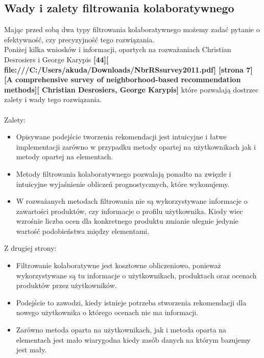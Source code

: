 \documentclass[12pt,a4paper]{report}
\begin{document}
\subsection{Wady i zalety filtrowania kolaboratywnego}
Mając przed sobą dwa typy filtrowania kolaboratywnego możemy zadać pytanie o efektywność, czy precyzyjność tego rozwiązania.
\\Poniżej kilka wniosków i informacji, opartych na rozważaniach Christian Desrosiers i George Karypis \textbf{[44][ file:///C:/Users/akuda/Downloads/NbrRSsurvey2011.pdf] [strona 7] [A comprehensive survey of neighborhood-based recommendation methods][ Christian Desrosiers, George Karypis]} które pozwalają dostrzec zalety i wady tego rozwiązania.
\\ 
\\Zalety:
\begin{itemize}
\item Opisywane podejście tworzenia rekomendacji jest intuicyjne i łatwe implementacji zarówno w przypadku metody opartej na użytkownikach jak i metody opartej na elementach. 
\item Metody filtrowania kolaboratywnego pozwalają ponadto na zwięzłe i intuicyjne wyjaśnienie obliczeń prognostycznych, które wykonujemy.
\item W rozważanych metodach filtrowania nie są wykorzystywane informacje o zawartości produktów, czy informacje o profilu użytkownika. Kiedy wiec wzrośnie liczba ocen dla konkretnego produktu zmianie ulegnie jedynie wartość podobieństwa między elementami.
\end{itemize}
Z drugiej strony:
\begin{itemize}
\item Filtrowanie kolaboratywne jest kosztowne obliczeniowo, ponieważ wykorzystywane są tu informacje o użytkownikach, produktach oraz ocenach produktów przez użytkowników. 
\item Podejście to zawodzi, kiedy istnieje potrzeba stworzenia rekomendacji dla nowego użytkownika o którego ocenach nie ma informacji.
\item Zarówno metoda oparta na użytkownikach, jak i metoda oparta na elementach jest mało wiarygodna kiedy zasób danych na którym bazujemy jest mały.
\end{itemize}
\end{document}
